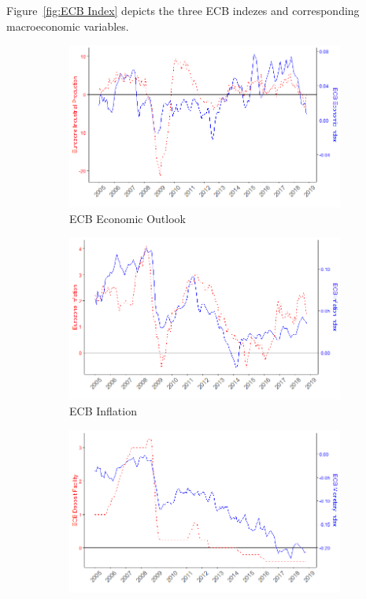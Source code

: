 \documentclass[review]{elsarticle}
\begin{document}
Figure~\ref{fig:ECB Index} depicts the three ECB indezes and corresponding macroeconomic variables. 

   \begin{figure}[h!]
    \centering
\begin{subfigure}{6cm}
    \includegraphics{ECB_eco_Industrial_prod.png}
    \caption{ECB Economic Outlook}
    \label{ECB_eco}
\end{subfigure}
\hfil
\begin{subfigure}{6cm}
    \includegraphics{ECB_inf_inf.png}
    \caption{ECB Inflation}
    \label{ECB_inf}
\end{subfigure}
\vfil
\begin{subfigure}{6cm}
    \includegraphics{ECB_mon_df.png}

\end{subfigure}
\end{figure}
\end{document}
